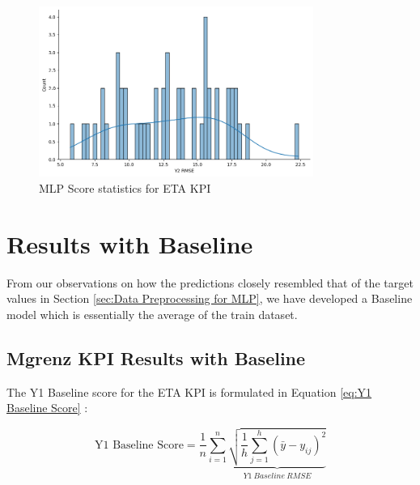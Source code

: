 \documentclass{report} %
\begin{document}
\begin{figure}[H]
    \centering
    \includegraphics[width=0.8\textwidth]{./ReportImages/score_MLP_y2.png } 
    \caption{MLP Score statistics for ETA \ac{KPI}} 
    \label{fig:MLP Score statistics for 3D KPI(ETA)}
\end{figure}

\section{Results with Baseline}\label{sec:Results with Baseline}

From our observations on how the predictions closely resembled that of the target values in Section \ref{sec:Data Preprocessing for MLP}, we have developed a Baseline model which is essentially the average of the train dataset.

\subsection{Mgrenz \ac{KPI} Results with Baseline}\label{sec:3D ETA Grid Results with Baseline}

The Y1 Baseline score for the ETA \ac{KPI} is formulated in Equation \ref{eq:Y1 Baseline Score} :

\begin{equation}
    \text{Y1 Baseline Score} = \frac{1}{n} \sum_{i=1}^{n} \underbrace{ \sqrt{\frac{1}{h} \sum_{j=1}^{h} (\bar{y} - y_{ij})^2}}_{Y1\ Baseline\ RMSE}
    \label{eq:Y1 Baseline Score}
    \end{equation}
    
    
\end{document}

